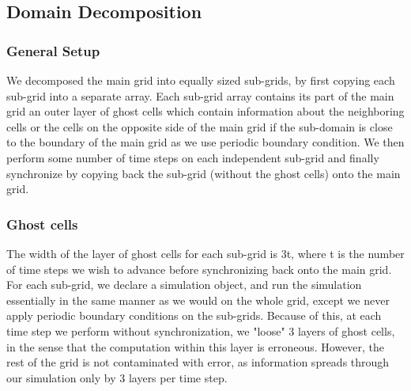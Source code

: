 \documentclass[11pt]{article}
\begin{document}
\subsection{Domain Decomposition}
\subsubsection{General Setup}
We decomposed the main grid into equally sized sub-grids, by first copying  each sub-grid into a separate array. Each sub-grid array contains its part of the main grid an outer layer of ghost cells which contain information about the neighboring cells or the cells on the opposite side of the main grid if the sub-domain is close to the boundary of the main grid as we use periodic boundary condition. We then perform some number of time steps on each independent sub-grid and finally synchronize by copying back the sub-grid (without the ghost cells) onto the main grid. 
\subsubsection{Ghost cells}

 The width of the layer of ghost cells for each sub-grid is 3t, where t is the number of time steps we wish to advance before synchronizing back onto the main grid. For each sub-grid, we declare a simulation object, and run the simulation essentially in the same manner as we would on the whole grid, except we never apply periodic boundary conditions on the sub-grids. Because of this, at each time step we perform without synchronization, we "loose" 3 layers of ghost cells, in the sense that the computation within this layer is erroneous. 
However, the rest of the grid is not contaminated with error, as information spreads through our simulation only by 3 layers per time step.
\end{document}
